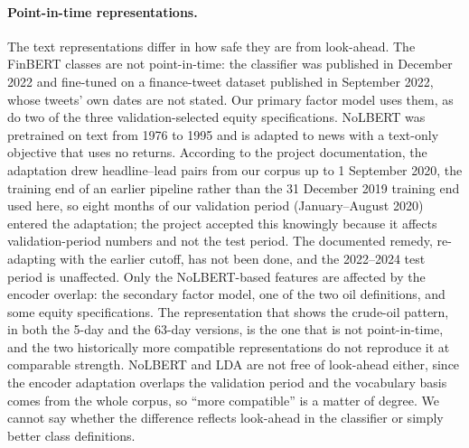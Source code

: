 \documentclass[11pt]{article}
\begin{document}
\paragraph{Point-in-time representations.} The text representations differ in how safe they are from look-ahead. The FinBERT classes are not point-in-time: the classifier was published in December 2022 and fine-tuned on a finance-tweet dataset published in September 2022, whose tweets' own dates are not stated. Our primary factor model uses them, as do two of the three validation-selected equity specifications. NoLBERT was pretrained on text from 1976 to 1995 and is adapted to news with a text-only objective that uses no returns. According to the project documentation, the adaptation drew headline--lead pairs from our corpus up to 1 September 2020, the training end of an earlier pipeline rather than the 31 December 2019 training end used here, so eight months of our validation period (January--August 2020) entered the adaptation; the project accepted this knowingly because it affects validation-period numbers and not the test period. The documented remedy, re-adapting with the earlier cutoff, has not been done, and the 2022--2024 test period is unaffected. Only the NoLBERT-based features are affected by the encoder overlap: the secondary factor model, one of the two oil definitions, and some equity specifications. The representation that shows the crude-oil pattern, in both the 5-day and the 63-day versions, is the one that is not point-in-time, and the two historically more compatible representations do not reproduce it at comparable strength. NoLBERT and LDA are not free of look-ahead either, since the encoder adaptation overlaps the validation period and the vocabulary basis comes from the whole corpus, so ``more compatible'' is a matter of degree. We cannot say whether the difference reflects look-ahead in the classifier or simply better class definitions.
\end{document}
